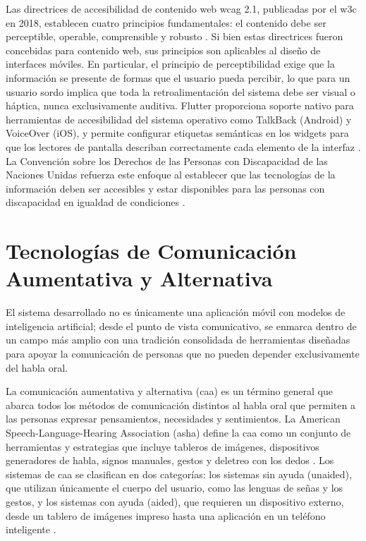 Las directrices de accesibilidad de contenido web \acrshort{wcag} 2.1, publicadas por el \acrshort{w3c} en
2018, establecen cuatro principios fundamentales: el contenido debe ser perceptible,
operable, comprensible y robusto \cite{w3c_wcag_2018}. Si bien estas directrices fueron
concebidas para contenido web, sus principios son aplicables al diseño de interfaces
móviles. En particular, el principio de perceptibilidad exige que la información se
presente de formas que el usuario pueda percibir, lo que para un usuario sordo implica que
toda la retroalimentación del sistema debe ser visual o háptica, nunca exclusivamente
auditiva. Flutter proporciona soporte nativo para herramientas de accesibilidad del sistema
operativo como TalkBack (Android) y VoiceOver (iOS), y permite configurar etiquetas
semánticas en los widgets para que los lectores de pantalla describan correctamente cada
elemento de la interfaz \cite{google_flutter_2024}. La Convención sobre los Derechos de
las Personas con Discapacidad de las Naciones Unidas refuerza este enfoque al establecer
que las tecnologías de la información deben ser accesibles y estar disponibles para las
personas con discapacidad en igualdad de condiciones \cite{onu_cdpd_2006}.

\section{Tecnologías de Comunicación Aumentativa y Alternativa}

El sistema desarrollado no es únicamente una aplicación móvil con modelos de inteligencia
artificial; desde el punto de vista comunicativo, se enmarca dentro de un campo más amplio
con una tradición consolidada de herramientas diseñadas para apoyar la comunicación de
personas que no pueden depender exclusivamente del habla oral.

La comunicación aumentativa y alternativa (\acrshort{caa}) es un término general que abarca todos
los métodos de comunicación distintos al habla oral que permiten a las personas expresar
pensamientos, necesidades y sentimientos. La American Speech-Language-Hearing Association
(\acrshort{asha}) define la \acrshort{caa} como un conjunto de herramientas y estrategias que incluye tableros
de imágenes, dispositivos generadores de habla, signos manuales, gestos y deletreo con los
dedos \cite{asha_aac_nodate}. Los sistemas de \acrshort{caa} se clasifican en dos categorías: los
sistemas sin ayuda (unaided), que utilizan únicamente el cuerpo del usuario, como las
lenguas de señas y los gestos, y los sistemas con ayuda (aided), que requieren un
dispositivo externo, desde un tablero de imágenes impreso hasta una aplicación en un
teléfono inteligente \cite{beukelman_aac_2020}.

